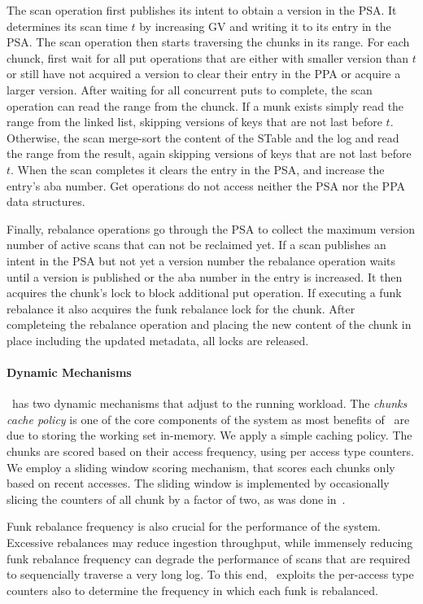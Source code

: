 The scan operation first publishes its intent to obtain a version in the PSA. It determines its scan time $t$ by increasing GV and writing it to its entry in the PSA. The scan operation then starts traversing the chunks in its range. For each chunck, first wait for all put operations that are either with smaller version than $t$ or still have not acquired a version to clear their entry in the PPA or acquire a larger version. After waiting for all concurrent puts to complete, the scan operation can read the range from the chunck. If a munk exists simply read the range from the linked list, skipping versions of keys that are not last before $t$. Otherwise, the scan merge-sort the content of the STable and the log and read the range from the result, again skipping versions of keys that are not last before $t$. When the scan completes it clears the entry in the PSA, and increase the entry's aba number. Get operations do not access neither the PSA nor the PPA data structures.

Finally, rebalance operations go through the PSA to collect the maximum version number of active scans that can not be reclaimed yet. If a scan publishes an intent in the PSA but not yet a version number the rebalance operation waits until a version is published or the aba number in the entry is increased. It then acquires the chunk's lock to block additional put operation. If executing a funk rebalance it also acquires the funk rebalance lock for the chunk. After completeing the rebalance operation and placing the new content of the chunk in place including the updated metadata, all locks are released.

\paragraph{Dynamic Mechanisms}
\sys\ has two dynamic mechanisms that adjust to the running workload. The \emph{chunks cache policy} is one of the core components of the system as most benefits of \sys\ are due to storing the working set in-memory. We apply a simple caching policy. 
The chunks are scored based on their access frequency, using per access type counters. We employ a sliding window scoring mechanism, that scores each chunks only based on recent accesses. The sliding window is implemented by occasionally slicing the counters of all chunk by a factor of two, as was done in~\cite{tinyLFU}.

Funk rebalance frequency is also crucial for the performance of the system. Excessive rebalances may reduce ingestion throughput, while immensely reducing funk rebalance frequency can degrade the performance of scans that are required to sequencially traverse a very long log. To this end, \sys\ exploits the per-access type counters also to determine the frequency in which each funk is rebalanced.

